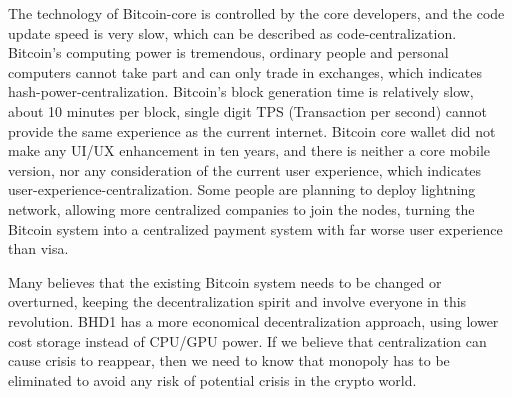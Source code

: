 \begin{flushleft}
    The technology of Bitcoin-core is controlled by the core developers, and the code update speed is very slow, which can be described as code-centralization. Bitcoin's computing power is tremendous, ordinary people and personal computers cannot take part and can only trade in exchanges, which indicates hash-power-centralization. Bitcoin's block generation time is relatively slow, about 10 minutes per block, single digit TPS (Transaction per second) cannot provide the same experience as the current internet. Bitcoin core wallet did not make any UI/UX enhancement in ten years, and there is neither a core mobile version, nor any consideration of the current user experience, which indicates user-experience-centralization. Some people are planning to deploy lightning network, allowing more centralized companies to join the nodes, turning the Bitcoin system into a centralized payment system with far worse user experience than visa.
\end{flushleft}
\begin{flushleft}
    Many believes that the existing Bitcoin system needs to be changed or overturned, keeping the decentralization spirit and involve everyone in this revolution. BHD1 has a more economical decentralization approach, using lower cost storage instead of CPU/GPU power. If we believe that centralization can cause crisis to reappear, then we need to know that monopoly has to be eliminated to avoid any risk of potential crisis in the crypto world.
\end{flushleft}
